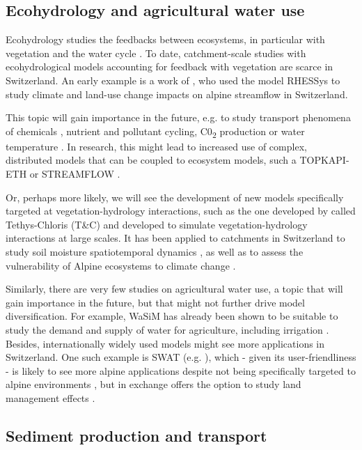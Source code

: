 \documentclass[10pt,a4paper]{article}
\begin{document}
\subsection{Ecohydrology and agricultural water use}
\label{sec:application:echohydrology}

Ecohydrology studies the feedbacks between ecosystems, in particular with vegetation and the water cycle \citep{tague200}. To date, catchment-scale studies with ecohydrological models accounting for feedback with vegetation are scarce in Switzerland. An early example is a work of \citet{zierl05}, who used the model RHESSys to study climate and land-use change impacts on alpine streamflow in Switzerland. 

This topic will gain importance in the future, e.g. to study transport phenomena of chemicals \citep{queloz2015}, nutrient and pollutant cycling, C0\textsubscript{2} production or water temperature \citep{michel2020}. In research, this might lead to increased use of complex, distributed models that can be coupled to ecosystem models, such a TOPKAPI-ETH \citep{Pappas_2015} or STREAMFLOW \citep{Gallice_2016}.

Or, perhaps more likely, we will see the development of new models specifically targeted at vegetation-hydrology interactions, such as the one developed by \citet{Fatichi2012,Fatichi2012a} called Tethys-Chloris (T\&C) and developed to simulate vegetation-hydrology interactions at large scales. It has been applied to catchments in Switzerland to study soil moisture spatiotemporal dynamics \citep{Fatichi2015a}, as well as to assess the vulnerability of Alpine ecosystems to climate change \citep{Mastrotheodoros2019}.

Similarly, there are very few studies on agricultural water use, a topic that will gain importance in the future, but that might not further drive model diversification. For example, WaSiM has already been shown to be suitable to study the demand and supply of water for agriculture, including irrigation \citep{Fuhrer2012}. Besides, internationally widely used models might see more applications in Switzerland. One such example is SWAT (e.g. \citealt{Abbaspour2007} ), which - given its user-friendliness - is likely to see more alpine applications despite not being specifically targeted to alpine environments \citep{Andrianaki2019}, but in exchange offers the option to study land management effects \citep{Zarrineh2018}.

\subsection{Sediment production and transport}
\label{sec:application:sediment}
\end{document}

